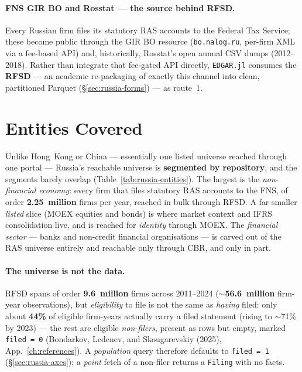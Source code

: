 \documentclass[11pt,a4paper]{report}
\begin{document}
\paragraph{FNS GIR BO and Rosstat --- the source behind RFSD.} Every Russian firm files its statutory RAS
accounts to the Federal Tax Service; these become public through the GIR BO resource (\texttt{bo.nalog.ru},
per-firm XML via a fee-based API) and, historically, Rosstat's open annual CSV dumps (2012--2018). Rather than
integrate that fee-gated API directly, \texttt{EDGAR.jl} consumes the \textbf{RFSD} --- an academic
re-packaging of exactly this channel into clean, partitioned Parquet (\S\ref{sec:russia-forms}) --- as route~1.

\section{Entities Covered}\label{sec:russia-entities}

Unlike Hong~Kong or China --- essentially one listed universe reached through one portal --- Russia's
reachable universe is \textbf{segmented by repository}, and the segments barely overlap
(Table~\ref{tab:russia-entities}). The largest is the \emph{non-financial economy}: every firm that files
statutory RAS accounts to the FNS, of order \textbf{2.25~million} firms per year, reached in bulk through
RFSD. A far smaller \emph{listed} slice (MOEX equities and bonds) is where market context and IFRS
consolidation live, and is reached for \emph{identity} through MOEX. The \emph{financial sector} --- banks and
non-credit financial organisations --- is carved out of the RAS universe entirely and reachable only through
CBR, and only in part.

\paragraph{The universe is not the data.} RFSD spans of order \textbf{9.6~million} firms across 2011--2024
($\sim$\textbf{56.6~million} firm-year observations), but \emph{eligibility} to file is not the same as
\emph{having} filed: only about \textbf{44\%} of eligible firm-years actually carry a filed statement (rising
to $\sim$71\% by 2023) --- the rest are eligible \emph{non-filers}, present as rows but empty, marked
\texttt{filed = 0} (Bondarkov, Ledenev, and Skougarevskiy (2025), App.~\ref{ch:references}). A
\emph{population} query therefore defaults to \texttt{filed = 1} (\S\ref{sec:russia-axes}); a \emph{point}
fetch of a non-filer returns a \texttt{Filing} with no facts.
\end{document}
